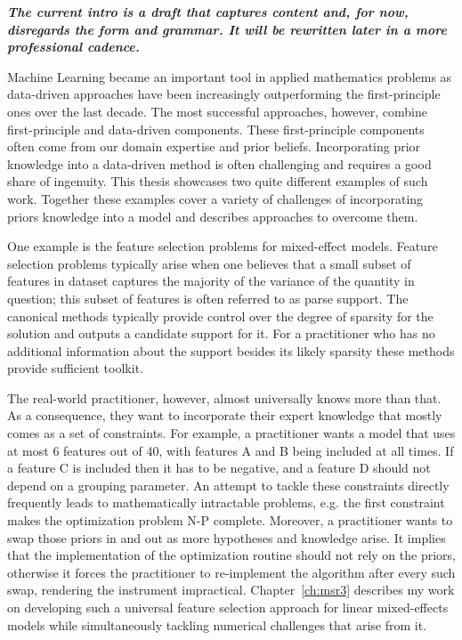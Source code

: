 \textbf{\textit{The current intro is a draft that captures content and, for now, disregards the form and grammar. It will be rewritten later in a more professional cadence.}}

Machine Learning became an important tool in applied mathematics problems as data-driven approaches have been increasingly outperforming the first-principle ones over the last decade. The most successful approaches, however, combine first-principle and data-driven components. These first-principle components often come from our domain expertise and prior beliefs. Incorporating prior knowledge into a data-driven method is often challenging and requires a good share of ingenuity. This thesis showcases two quite different examples of such work. Together these examples cover a variety of challenges of incorporating priors knowledge into a model and describes approaches to overcome them.

One example is the feature selection problems for mixed-effect models. Feature selection problems typically arise when one believes that a small subset of features in dataset captures the majority of the variance of the quantity in question; this subset of features is often referred to as parse support. The canonical methods typically provide control over the degree of sparsity for the solution and outputs a candidate support for it. For a practitioner who has no additional information about the support besides its likely sparsity these methods provide sufficient toolkit.

The real-world practitioner, however, almost universally knows more than that. As a consequence, they want to incorporate their expert knowledge that mostly comes as a set of constraints. For example, a practitioner wants a model that uses at most 6 features out of 40, with features A and B being included at all times. If a feature C is included then it has to be negative, and a feature D should not depend on a grouping parameter. An attempt to tackle these constraints directly frequently leads to mathematically intractable problems, e.g. the first constraint makes the optimization problem N-P complete. Moreover, a practitioner wants to swap those priors in and out as more hypotheses and knowledge arise. It implies that the implementation of the optimization routine should not rely on the priors, otherwise it forces the practitioner to re-implement the algorithm after every such swap, rendering the instrument impractical. Chapter~\ref{ch:msr3} describes my work on developing such a universal feature selection approach for linear mixed-effects models while simultaneously tackling numerical challenges that arise from it. 

